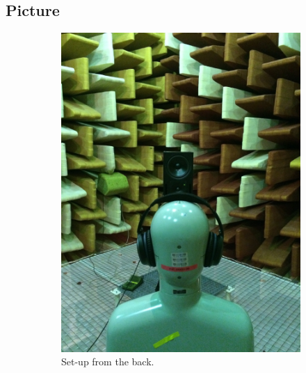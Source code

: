 \subsection{Picture}
\begin{figure}[H]
	\centering
	\begin{subfigure}[b]{0.5\textwidth}
		\centering
		\includegraphics[width=\textwidth]{../Journal/Experiments/TestofConsumerHeadphones/Pictures/OtherBrandsSetupBack.jpg}
		\caption{Set-up from the back.}
	\end{subfigure}\qquad
	\begin{subfigure}[b]{0.4\textwidth}

\end{subfigure}
\end{figure}
